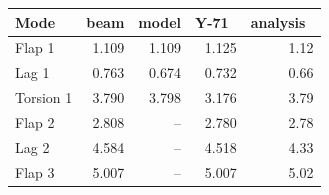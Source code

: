 \begin{tabular}{@{}lrrrr@{}}
\toprule
Mode & beam & model & Y-71~\cite{tr} & analysis~\cite{pt} \\
\midrule
Flap 1 & 1.109 & 1.109 & 1.125 & 1.12 \\
Lag 1 & 0.763 & 0.674 & 0.732 & 0.66 \\
Torsion 1 & 3.790 & 3.798 & 3.176 & 3.79 \\
Flap 2 & 2.808 & -- & 2.780 & 2.78 \\
Lag 2 & 4.584 & -- & 4.518 & 4.33 \\
Flap 3 & 5.007 & -- & 5.007 & 5.02 \\
\bottomrule
\end{tabular}
